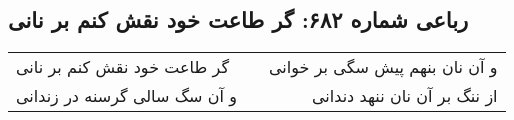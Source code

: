 \begin{center}
\section*{رباعی شماره ۶۸۲: گر طاعت خود نقش کنم بر نانی}
\label{sec:sh682}
\begin{longtable}{l p{0.5cm} r}
گر طاعت خود نقش کنم بر نانی
&&
و آن نان بنهم پیش سگی بر خوانی
\\
و آن سگ سالی گرسنه در زندانی
&&
از ننگ بر آن نان ننهد دندانی
\\
\end{longtable}
\end{center}
